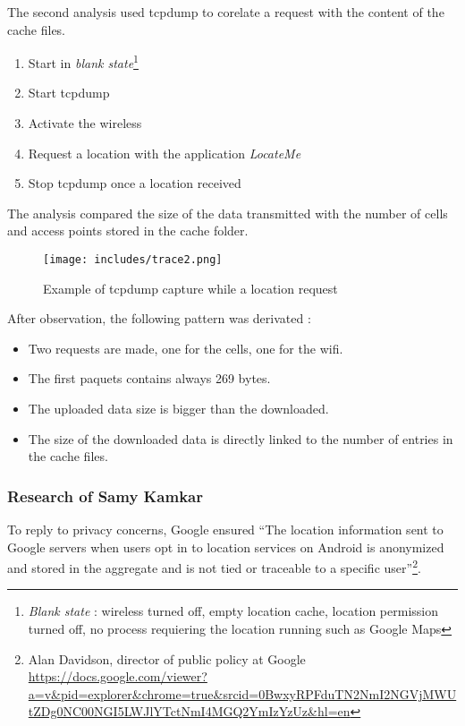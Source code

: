 \documentclass{report}
\begin{document}
The second analysis used tcpdump to corelate a request with the content of the cache files.

\begin{enumerate}
\item Start in \emph{blank state}\footnote{\emph{Blank state} : wireless turned off, empty location cache, location permission turned off, no process requiering the location running such as Google Maps}
\item Start tcpdump
\item Activate the wireless
\item Request a location with the application \emph{LocateMe}
\item Stop tcpdump once a location received
\end{enumerate}

The analysis compared the size of the data transmitted with the number of cells and access points stored in the cache folder.\\

\begin{figure}[h]
  \hspace*{-2cm}
  \centering
  \texttt{[image: includes/trace2.png]}
  \caption{Example of tcpdump capture while a location request}
  \label{fig:tcpdump}
\end{figure}

After observation, the following pattern was derivated :
\begin{itemize}
\item Two requests are made, one for the cells, one for the wifi.
\item The first paquets contains always 269 bytes.
\item The uploaded data size is bigger than the downloaded.
\item The size of the downloaded data is directly linked to the number of entries in the cache files.
\end{itemize}


\subsubsection{Research of Samy Kamkar}

To reply to privacy concerns, Google ensured ``The location information sent to Google servers when users opt in to location services on Android is anonymized and stored in the aggregate and is not tied or traceable to a specific user''\footnote{Alan Davidson, director of public policy at Google \url{https://docs.google.com/viewer?a=v&pid=explorer&chrome=true&srcid=0BwxyRPFduTN2NmI2NGVjMWUtZDg0NC00NGI5LWJlYTctNmI4MGQ2YmIzYzUz&hl=en}}.\\
\end{document}
